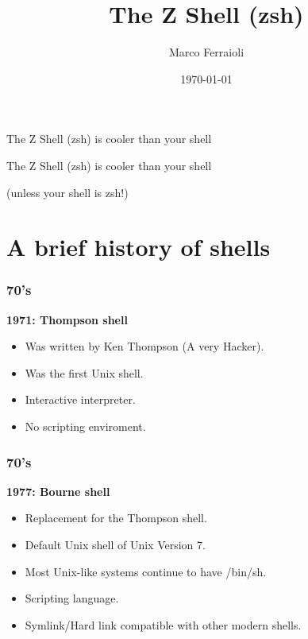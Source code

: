 \documentclass[aspectratio=169]{beamer}
\title[Short title]{The Z Shell (zsh)}
\author{Marco Ferraioli}
\institute[IrLUG]
{
Linux Day Avellino\\
Mail: marcoferraioli@live.com\\
Site: marcoferraioli.com
}
\date{\today} %
\begin{document}
\begin{frame}
	\titlepage %
\end{frame}


\begin{frame}
    \Huge{\centerline{The Z Shell (zsh) is cooler than your shell}}
\end{frame}



\begin{frame}
    \Huge{\centerline{The Z Shell (zsh) is cooler than your shell}}
    \Huge{\centerline{(unless your shell is zsh!)}}
\end{frame}



\section{A brief history of shells} 

\begin{frame}
	\frametitle{ 70's}
	\textbf{1971: Thompson shell}
	\begin{itemize}
		\item Was written by Ken Thompson (A very Hacker).
		\item Was the first Unix shell.
		\item Interactive interpreter.
		\item No scripting enviroment.
	\end{itemize}
\end{frame}


\begin{frame}
	\frametitle{ 70's}
	\textbf{1977: Bourne shell}
	\begin{itemize}
		\item Replacement for the Thompson shell.
		\item Default Unix shell of Unix Version 7. 
		\item Most Unix-like systems continue to have /bin/sh.
		\item Scripting language.
		\item Symlink/Hard link compatible with other modern shells.
	\end{itemize}
\end{frame}
\end{document}
